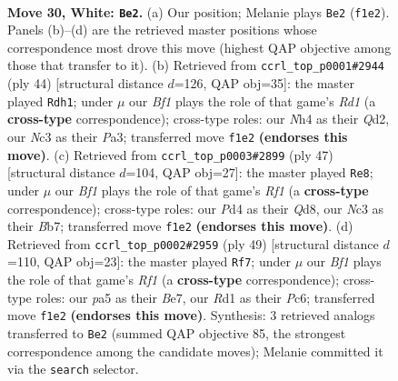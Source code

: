 \documentclass[11pt]{article}
\begin{document}
\clearpage

\begin{figure}[p]\centering
\begin{subfigure}{0.46\textwidth}\centering
\resizebox{\linewidth}{!}{%
\newchessgame
\chessboard[
  setfen={1nb1r3/rp4k1/2pqp3/p2p1p1p/Pn1P1P1N/2N3P1/1PPQ2KP/3R1B1R w - - 13 30},
  showmover=false,
  pgfstyle=straightmove, color=movearrow, markmove={f1-e2}
]}
\caption{}
\end{subfigure}\hfill
\begin{subfigure}{0.46\textwidth}\centering
\resizebox{\linewidth}{!}{%
\newchessgame
\chessboard[
  setfen={r1bq2k1/1p1n1r1p/p2p2n1/2pPp3/B1P1PpP1/P1N2P1R/1P1QN3/2KR4 w - - 2 23},
  showmover=false,
  pgfstyle=straightmove, color=movearrow, markmove={d1-h1}
]}
\caption{}
\end{subfigure}
\\[4pt]
\begin{subfigure}{0.46\textwidth}\centering
\resizebox{\linewidth}{!}{%
\newchessgame
\chessboard[
  setfen={r2q1rk1/1b3pp1/1p1p1n1p/2n1pP2/p1P1P3/P1N1Q2P/1P1NBRPK/3R4 b - - 1 24},
  showmover=false,
  pgfstyle=straightmove, color=movearrow, markmove={f8-e8}
]}
\caption{}
\end{subfigure}\hfill
\begin{subfigure}{0.46\textwidth}\centering
\resizebox{\linewidth}{!}{%
\newchessgame
\chessboard[
  setfen={4rrk1/p3b1p1/2p1qp2/2p1p2p/2Nn4/1PNP1PPb/PQ1BPR1P/4R2K b - - 8 25},
  showmover=false,
  pgfstyle=straightmove, color=movearrow, markmove={f8-f7}
]}
\caption{}
\end{subfigure}
\caption{\textbf{Move 30, White: \texttt{Be2}.} (a) Our position; Melanie plays \texttt{Be2} (\texttt{f1e2}). Panels (b)--(d) are the retrieved master positions whose correspondence most drove this move (highest QAP objective among those that transfer to it). (b) Retrieved from \texttt{ccrl\_top\_p0001\#2944} (ply 44) [structural distance $d$=126, QAP obj=35]: the master played \texttt{Rdh1}; under $\mu$ our \emph{Bf1} plays the role of that game's \emph{Rd1} (a \textbf{cross-type} correspondence); cross-type roles: our \emph{N}h4 as their \emph{Q}d2, our \emph{N}c3 as their \emph{P}a3; transferred move \texttt{f1e2} \textbf{(endorses this move)}. (c) Retrieved from \texttt{ccrl\_top\_p0003\#2899} (ply 47) [structural distance $d$=104, QAP obj=27]: the master played \texttt{Re8}; under $\mu$ our \emph{Bf1} plays the role of that game's \emph{Rf1} (a \textbf{cross-type} correspondence); cross-type roles: our \emph{P}d4 as their \emph{Q}d8, our \emph{N}c3 as their \emph{B}b7; transferred move \texttt{f1e2} \textbf{(endorses this move)}. (d) Retrieved from \texttt{ccrl\_top\_p0002\#2959} (ply 49) [structural distance $d$=110, QAP obj=23]: the master played \texttt{Rf7}; under $\mu$ our \emph{Bf1} plays the role of that game's \emph{Rf1} (a \textbf{cross-type} correspondence); cross-type roles: our \emph{p}a5 as their \emph{B}e7, our \emph{R}d1 as their \emph{P}c6; transferred move \texttt{f1e2} \textbf{(endorses this move)}. Synthesis: 3 retrieved analogs transferred to \texttt{Be2} (summed QAP objective 85, the strongest correspondence among the candidate moves); Melanie committed it via the \texttt{search} selector.}

\end{figure}
\end{document}
